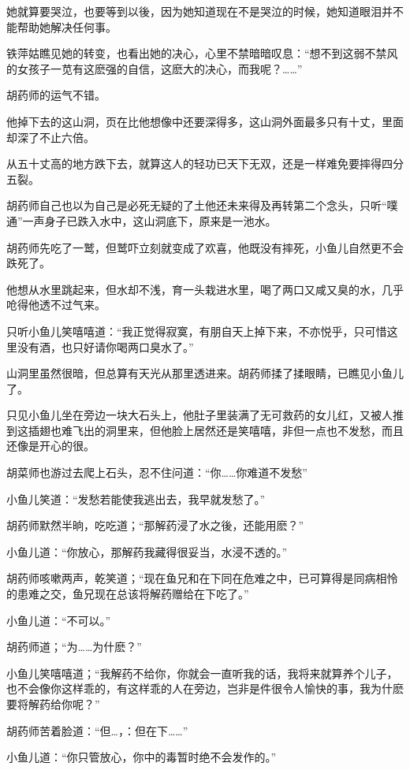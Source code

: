 \documentclass[12pt,oneside]{book}
\begin{document}
她就算要哭泣，也要等到以後，因为她知道现在不是哭泣的时候，她知道眼泪并不能帮助她解决任何事。

铁萍姑瞧见她的转变，也看出她的决心，心里不禁暗暗叹息：``想不到这弱不禁风的女孩子一苋有这麽强的自信，这麽大的决心，而我呢？\ldots\ldots{}''

胡药师的运气不错。

他掉下去的这山洞，页在比他想像中还要深得多，这山洞外面最多只有十丈，里面却深了不止六倍。

从五十丈高的地方跌下去，就算这人的轻功已天下无双，还是一样难免要摔得四分五裂。

胡药师自己也以为自己是必死无疑的了土他还未来得及再转第二个念头，只听``噗通''一声身子已跌入水中，这山洞底下，原来是一池水。

胡药师先吃了一鹫，但鹫吓立刻就变成了欢喜，他既没有摔死，小鱼儿自然更不会跌死了。

他想从水里跳起来，但水却不浅，育一头栽进水里，喝了两口又咸又臭的水，几乎呛得他透不过气来。

只听小鱼儿笑嘻嘻道：``我正觉得寂寞，有朋自天上掉下来，不亦悦乎，只可惜这里没有酒，也只好请你喝两口臭水了。''

山洞里虽然很暗，但总算有天光从那里透进来。胡药师揉了揉眼睛，已瞧见小鱼儿了。

只见小鱼儿坐在旁边一块大石头上，他肚子里装满了无可救药的女儿红，又被人推到这插翅也难飞出的洞里来，但他脸上居然还是笑嘻嘻，非但一点也不发愁，而且还像是开心的很。

胡菜师也游过去爬上石头，忍不住问道：``你\ldots\ldots 你难道不发愁''

小鱼儿笑道：``发愁若能使我逃出去，我早就发愁了。''

胡药师默然半晌，吃吃道；``那解药浸了水之後，还能用麽？''

小鱼儿道：``你放心，那解药我藏得很妥当，水浸不透的。''

胡药师咳嗽两声，乾笑道；``现在鱼兄和在下同在危难之中，已可算得是同病相怜的患难之交，鱼兄现在总该将解药赠给在下吃了。''

小鱼儿道：``不可以。''

胡药师道；``为\ldots\ldots 为什麽？''

小鱼儿笑嘻嘻道；``我解药不给你，你就会一直听我的话，我将来就算养个儿子，也不会像你这样乖的，有这样乖的人在旁边，岂非是件很令人愉快的事，我为什麽要将解药给你呢？''

胡药师苦着脸道：``但\ldots，：但在下\ldots\ldots{}''

小鱼儿道：``你只管放心，你中的毒暂时绝不会发作的。''
\end{document}
